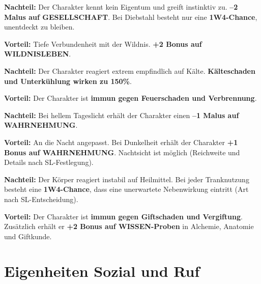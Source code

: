 \begin{traitbox}{}
	
	\textbf{Nachteil:}  
	Der Charakter kennt kein Eigentum und greift instinktiv zu.
	\textbf{–2 Malus auf GESELLSCHAFT}.
	Bei Diebstahl besteht nur eine \textbf{1W4-Chance}, unentdeckt zu bleiben.
	
	\medskip
	\textbf{Vorteil:}  
	Tiefe Verbundenheit mit der Wildnis.
	\textbf{+2 Bonus auf WILDNISLEBEN}.
	
\end{traitbox}

\begin{traitbox}{}
	
	\textbf{Nachteil:}  
	Der Charakter reagiert extrem empfindlich auf Kälte.
	\textbf{Kälteschaden und Unterkühlung wirken zu 150\%}.
	
	\medskip
	\textbf{Vorteil:}  
	Der Charakter ist \textbf{immun gegen Feuerschaden und Verbrennung}.
	
\end{traitbox}

\begin{traitbox}{}
	
	\textbf{Nachteil:}  
	Bei hellem Tageslicht erhält der Charakter einen
	\textbf{–1 Malus auf WAHRNEHMUNG}.
	
	\medskip
	\textbf{Vorteil:}  
	An die Nacht angepasst.
	Bei Dunkelheit erhält der Charakter
	\textbf{+1 Bonus auf WAHRNEHMUNG}.
	Nachtsicht ist möglich (Reichweite und Details nach SL-Festlegung).
	
\end{traitbox}

\begin{traitbox}{}
	
	\textbf{Nachteil:}  
	Der Körper reagiert instabil auf Heilmittel.
	Bei jeder Tranknutzung besteht eine \textbf{1W4-Chance},
	dass eine unerwartete Nebenwirkung eintritt
	(Art nach SL-Entscheidung).
	
	\medskip
	\textbf{Vorteil:}  
	Der Charakter ist \textbf{immun gegen Giftschaden und Vergiftung}.
	Zusätzlich erhält er
	\textbf{+2 Bonus auf WISSEN-Proben} in
	Alchemie, Anatomie und Giftkunde.
	
\end{traitbox}

\section{Eigenheiten Sozial und Ruf}

